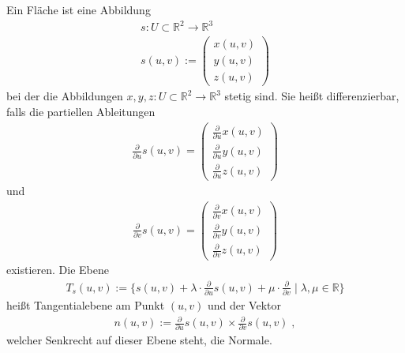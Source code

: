 \begin{Definition}
Ein Fläche ist   eine Abbildung
\begin{align*}
s: U \subset \mathbb{R}^2 \to \mathbb{R}^3 \\
s(u,v) := \begin{pmatrix} x(u,v) \\ y(u,v) \\ z(u,v) \end{pmatrix} 
\end{align*} 
bei der die Abbildungen $x, y, z : U \subset \mathbb{R}^2 \to \mathbb{R}^3$ stetig sind. Sie heißt differenzierbar, falls die partiellen Ableitungen
\begin{align*}
\frac{\partial}{\partial u} s(u,v) = \begin{pmatrix}  \frac{\partial}{\partial u} x(u,v) \\  \frac{\partial}{\partial u} y(u,v) \\  \frac{\partial}{\partial u} z(u,v) \end{pmatrix}
\end{align*}
und 
\begin{align*}
\frac{\partial}{\partial v} s(u,v) =  \begin{pmatrix} \frac{\partial}{\partial v} x(u,v) \\ \frac{\partial}{\partial v} y(u,v) \\ \frac{\partial}{\partial v} z(u,v) \end{pmatrix}
\end{align*}
existieren. Die Ebene 
\begin{align*}
T_s(u,v) :=  \{ s(u,v) + \lambda \cdot \frac{\partial}{\partial u} s(u,v) + \mu \cdot \frac{\partial}{\partial v} \; | \; \lambda, \mu \in \mathbb{R} \}
\end{align*}
heißt Tangentialebene am Punkt $(u,v)$ und  der Vektor 
\begin{align*}
n (u,v):= \frac{\partial}{\partial u} s(u,v) \times \frac{\partial}{\partial v} s(u,v) \; ,
\end{align*}
welcher Senkrecht auf dieser Ebene steht,  die Normale.
\end{Definition}

